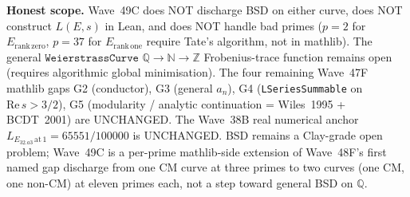 \begin{remark}
\textbf{Honest scope.} Wave~49C does NOT discharge BSD on either curve, does NOT construct $L(E, s)$ in Lean, and does NOT handle bad primes ($p = 2$ for $E_{\mathrm{rank\,zero}}$, $p = 37$ for $E_{\mathrm{rank\,one}}$ require Tate's algorithm, not in mathlib). The general $\texttt{WeierstrassCurve } \mathbb{Q} \to \mathbb{N} \to \mathbb{Z}$ Frobenius-trace function remains open (requires algorithmic global minimisation). The four remaining Wave~47F mathlib gaps G2 (conductor), G3 (general $a_n$), G4 (\texttt{LSeriesSummable} on $\mathrm{Re}\,s > 3/2$), G5 (modularity / analytic continuation = Wiles~1995 + BCDT~2001) are UNCHANGED. The Wave~38B real numerical anchor $L_{E_{32.a3}\,\mathrm{at}\,1} = 65551/100000$ is UNCHANGED. BSD remains a Clay-grade open problem; Wave~49C is a per-prime mathlib-side extension of Wave~48F's first named gap discharge from one CM curve at three primes to two curves (one CM, one non-CM) at eleven primes each, not a step toward general BSD on $\mathbb{Q}$.
\end{remark}


